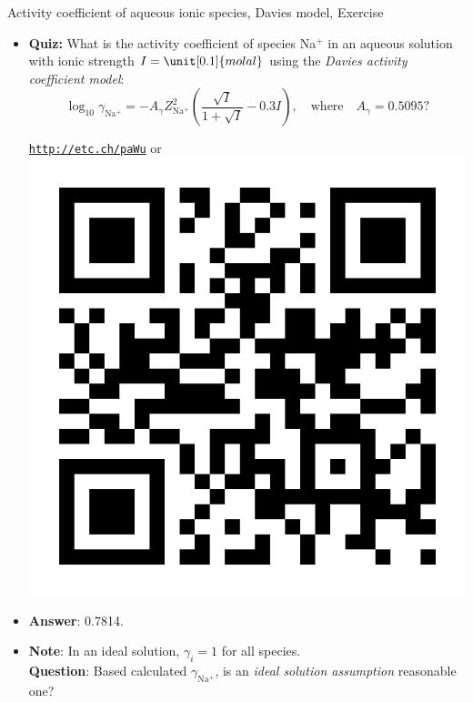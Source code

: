 \begin{frame}{Activity coefficient of aqueous ionic species, Davies model, Exercise}

\begin{itemize}
\item \alert{\textbf{Quiz:}} What is the activity coefficient of species Na$^{+}$ in an aqueous solution with ionic strength $I=\unit[0.1]{molal}$ using the \emph{Davies activity coefficient model}:
\[
\log_{10}\gamma_{\mathrm{Na^{+}}}=-A_{\gamma}Z_{\mathrm{Na^{+}}}^{2}\left(\dfrac{\sqrt{I}}{1+\sqrt{I}}-0.3I\right), \quad \mbox{where} \quad A_{\gamma}=0.5095?
\]
%
\begin{center}
\href{http://etc.ch/paWu}{\textcolor{indigo(dye)}{\tt http://etc.ch/paWu}} \quad or \quad 
\includegraphics[height=0.18\columnwidth]{figures/activity-models/poll-ionic-strength.png}
\end{center}
%
\hiddenpause
\item \textbf{Answer}: 0.7814.
\pause
\item \textbf{Note}: 
In an ideal solution, $\gamma_{i}=1$ for all species. \\
\textbf{Question}: Based calculated $\gamma_{\mathrm{Na^{+}}}$, is an \emph{ideal solution assumption } reasonable one?
\end{itemize}
\end{frame}
%
%
